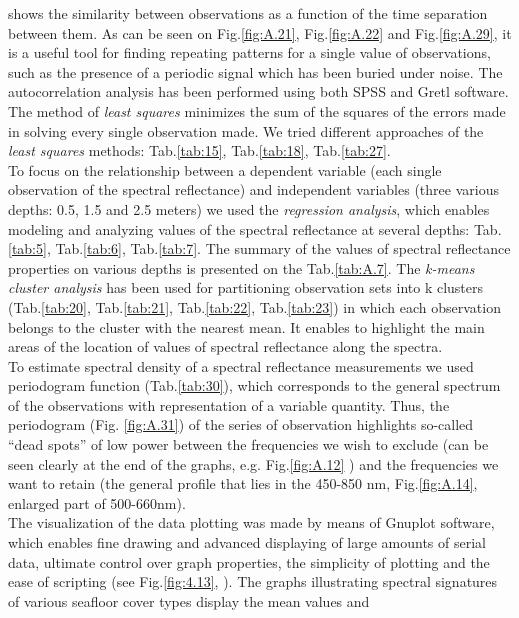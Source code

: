 \documentclass[10pt, a4paper]{article}
\begin{document}
 shows the similarity between observations as a function of the time separation between them. As can be seen on Fig.\ref{fig:A.21}, Fig.\ref{fig:A.22} and Fig.\ref{fig:A.29}, it is a useful tool for finding repeating patterns for a single value of observations, such as the presence of a periodic signal which has been buried under noise. The autocorrelation analysis has been performed using both SPSS and Gretl software. \\
The method of \textit{least squares} minimizes the sum of the squares of the errors made in solving every single observation made. We tried different approaches of the \textit{least squares} methods: Tab.\ref{tab:15}, Tab.\ref{tab:18}, Tab.\ref{tab:27}.\\
To focus on the relationship between a dependent variable (each single observation of the spectral reflectance) and independent variables (three various depths: 0.5, 1.5 and 2.5 meters) we used the \textit{regression analysis}, which enables modeling and analyzing values of the spectral reflectance at several depths: Tab.\ref{tab:5}, Tab.\ref{tab:6}, Tab.\ref{tab:7}. 
The summary of the values of spectral reflectance properties on various depths is presented on the Tab.\ref{tab:A.7}.
The \textit{k-means cluster analysis} has been used for partitioning observation sets into k clusters (Tab.\ref{tab:20}, Tab.\ref{tab:21}, Tab.\ref{tab:22}, Tab.\ref{tab:23}) in which each observation belongs to the cluster with the nearest mean.
It enables to highlight the main areas of the location of values of spectral reflectance along the spectra.\\
To estimate spectral density of a spectral reflectance measurements we used periodogram function (Tab.\ref{tab:30}), 
which corresponds to the general spectrum of the observations with representation of a variable quantity.  
Thus, the periodogram (Fig. \ref{fig:A.31}) of the series of observation highlights so-called “dead spots” of low power between the frequencies we wish to
exclude (can be seen clearly at the end of the graphs, e.g. Fig.\ref{fig:A.12} ) 
and the frequencies we want to retain (the general profile that lies in the 450-850 nm, Fig.\ref{fig:A.14}, enlarged part of 500-660nm).\\
The visualization of the data plotting was made by means of Gnuplot software, which enables fine
drawing and advanced displaying of large amounts of serial data, ultimate control over graph properties, 
the simplicity of plotting and the ease of scripting (see Fig.\ref{fig:4.13}, ).
The graphs illustrating spectral signatures of various seafloor cover types display the mean values and
\end{document}
